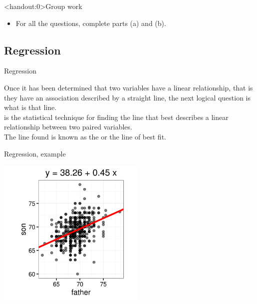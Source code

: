 \documentclass[xcolor=table, aspectratio=169, bigger, handout]{beamer}
\begin{document}
\begin{frame}<handout:0>{Group work}
\begin{block}{}
\begin{itemize}
\item For all the questions, complete parts (a) and (b).
\end{itemize}
\end{block}
\end{frame}

%
%
\subsection{Regression}

\begin{frame}{Regression}
\begin{block}{}
Once it has been determined that two variables have a linear relationship, that is they have an association described by a straight line, the next logical question is what is that line.\\
\pause\medskip
{} is the statistical technique for finding the line that best describes a linear relationship between two paired variables.\\
\pause\medskip
The line found is known as the  or the line of best fit.
\end{block}
\end{frame}

\begin{frame}{Regression, example}

\medskip
{\centering
\includegraphics[width=2.8in]{../images/ch10_reg_galton}
\par}

\end{frame}
\end{document}
